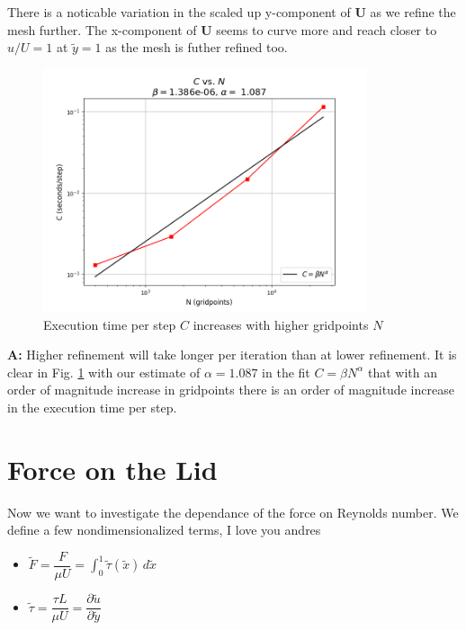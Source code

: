 \documentclass[11pt]{article}
\begin{document}
There is a noticable variation in the scaled up y-component of $\textbf{U}$ as we refine the mesh further. The x-component of $\textbf{U}$ seems to curve more and reach closer to $u/U = 1$ at $\tilde{y}=1$ as the mesh is futher refined too. 

\pagebreak
\begin{figure}[H]
   \centering
   \includegraphics[width=0.85\textwidth]{images/Refinement_Measure.png}
   \caption{Execution time per step $C$ increases with higher gridpoints $N$}
   \label{timerefine}
\end{figure} 

\begin{center} 
\end{center}

\textbf{A:} Higher refinement will take longer per iteration than at lower refinement. It is clear in Fig. \ref{timerefine} with our estimate of $\alpha = 1.087$ in the fit $C = \beta N^{\alpha}$ that with an order of magnitude increase in gridpoints there is an order of magnitude increase in the execution time per step.

\pagebreak

\section{Force on the Lid}
Now we want to investigate the dependance of the force on Reynolds number. We define a few nondimensionalized terms, I love you andres
\begin{itemize}
   \item $\tilde{F} = \dfrac{F}{\mu U} = \displaystyle \int_{0}^{1} \tilde{\tau}(\tilde{x})\, d\tilde{x}$
   \vspace{2.5mm}

   \item $\tilde{\tau} = \dfrac{\tau L}{\mu U} = \dfrac{\partial\tilde{u}}{\partial\tilde{y}}$
\end{itemize}
\end{document}
